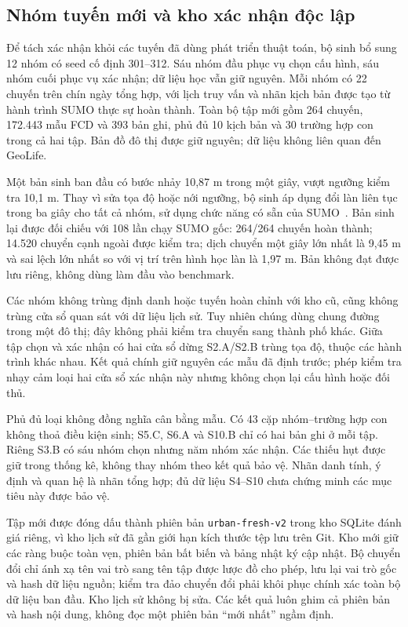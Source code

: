 \subsection{Nhóm tuyến mới và kho xác nhận độc lập}
\label{sec:fresh-dataset}

Để tách xác nhận khỏi các tuyến đã dùng phát triển thuật toán, bộ sinh bổ sung 12 nhóm có seed cố định 301--312. Sáu nhóm đầu phục vụ chọn cấu hình, sáu nhóm cuối phục vụ xác nhận; dữ liệu học vẫn giữ nguyên. Mỗi nhóm có 22 chuyến trên chín ngày tổng hợp, với lịch truy vấn và nhãn kịch bản được tạo từ hành trình SUMO thực sự hoàn thành. Toàn bộ tập mới gồm 264 chuyến, 172.443 mẫu FCD và 393 bản ghi, phủ đủ 10 kịch bản và 30 trường hợp con trong cả hai tập. Bản đồ đô thị được giữ nguyên; dữ liệu không liên quan đến GeoLife.

Một bản sinh ban đầu có bước nhảy 10,87 m trong một giây, vượt ngưỡng kiểm tra 10,1 m. Thay vì sửa tọa độ hoặc nới ngưỡng, bộ sinh áp dụng đổi làn liên tục trong ba giây cho tất cả nhóm, sử dụng chức năng có sẵn của SUMO~\cite{sumosublane}. Bản sinh lại được đối chiếu với 108 lần chạy SUMO gốc: 264/264 chuyến hoàn thành; 14.520 chuyển cạnh ngoài được kiểm tra; dịch chuyển một giây lớn nhất là 9,45 m và sai lệch lớn nhất so với vị trí trên hình học làn là 1,97 m. Bản không đạt được lưu riêng, không dùng làm đầu vào benchmark.

Các nhóm không trùng định danh hoặc tuyến hoàn chỉnh với kho cũ, cũng không trùng cửa sổ quan sát với dữ liệu lịch sử. Tuy nhiên chúng dùng chung đường trong một đô thị; đây không phải kiểm tra chuyển sang thành phố khác. Giữa tập chọn và xác nhận có hai cửa sổ dừng S2.A/S2.B trùng tọa độ, thuộc các hành trình khác nhau. Kết quả chính giữ nguyên các mẫu đã định trước; phép kiểm tra nhạy cảm loại hai cửa sổ xác nhận này nhưng không chọn lại cấu hình hoặc đối thủ.



Phủ đủ loại không đồng nghĩa cân bằng mẫu. Có 43 cặp nhóm--trường hợp con không thoả điều kiện sinh; S5.C, S6.A và S10.B chỉ có hai bản ghi ở mỗi tập. Riêng S3.B có sáu nhóm chọn nhưng năm nhóm xác nhận. Các thiếu hụt được giữ trong thống kê, không thay nhóm theo kết quả bảo vệ. Nhãn danh tính, ý định và quan hệ là nhãn tổng hợp; đủ dữ liệu S4--S10 chưa chứng minh các mục tiêu này được bảo vệ.

Tập mới được đóng dấu thành phiên bản \texttt{urban-fresh-v2} trong kho SQLite đánh giá riêng, vì kho lịch sử đã gần giới hạn kích thước tệp lưu trên Git. Kho mới giữ các ràng buộc toàn vẹn, phiên bản bất biến và bảng nhật ký cập nhật. Bộ chuyển đổi chỉ ánh xạ tên vai trò sang tên tập được lược đồ cho phép, lưu lại vai trò gốc và hash dữ liệu nguồn; kiểm tra đảo chuyển đổi phải khôi phục chính xác toàn bộ dữ liệu ban đầu. Kho lịch sử không bị sửa. Các kết quả luôn ghim cả phiên bản và hash nội dung, không đọc một phiên bản ``mới nhất'' ngầm định.
